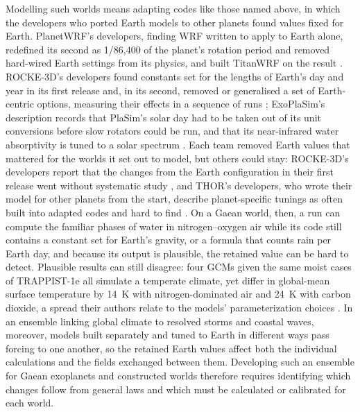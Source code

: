 Modelling such worlds means adapting codes like those named above, in which the developers who ported Earth
models to other planets found values fixed for Earth. PlanetWRF's developers, finding WRF written to apply to
Earth alone, redefined its second as 1/86,400 of the planet's rotation period and removed hard-wired Earth
settings from its physics, and built TitanWRF on the result
\autocite{richardson2007planetwrf,newman2011stratospheric}. ROCKE-3D's developers found constants set for the lengths of Earth's day and year in its first release and, in its second, removed or generalised a set of
Earth-centric options, measuring their effects in a sequence of runs
\autocite{way2017resolving,tsigaridis2025rocke3d}; ExoPlaSim's description records that PlaSim's solar day had
to be taken out of its unit conversions before slow rotators could be run, and that its near-infrared water
absorptivity is tuned to a solar spectrum \autocite{paradise2022exoplasim}. Each team removed Earth values
that mattered for the worlds it set out to model, but others could stay: ROCKE-3D's developers report that the
changes from the Earth configuration in their first release went without systematic study \autocite{tsigaridis2025rocke3d},
and THOR's developers, who wrote their model for other planets from the start, describe planet-specific tunings
as often built into adapted codes and hard to find \autocite{deitrick2020thor}. On a Gaean world, then, a run can
compute the familiar phases of water in nitrogen--oxygen air while its code still contains a constant set for Earth's gravity,
or a formula that counts rain per Earth day, and because its output is plausible, the retained value can be hard
to detect. Plausible results can still disagree: four GCMs given the same moist cases of TRAPPIST-1e all simulate a
temperate climate, yet differ in global-mean surface temperature by 14~K with nitrogen-dominated air and 24~K with carbon
dioxide, a spread their authors relate to the models' parameterization choices \autocite{sergeev2022thai}. In an
ensemble linking global climate to resolved storms and coastal waves, moreover, models built separately and tuned
to Earth in different ways pass forcing to one another, so the retained Earth values affect both the individual
calculations and the fields exchanged between them. Developing such an ensemble for Gaean exoplanets
and constructed worlds therefore requires identifying which changes follow from general laws and which must be calculated or calibrated for each world.

